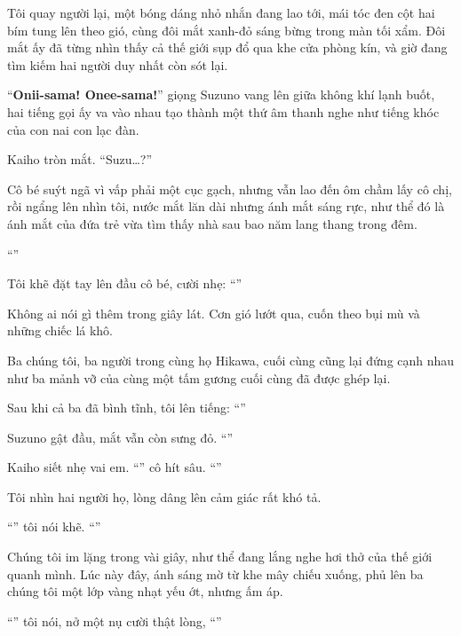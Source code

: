 \documentclass[../main.tex]{subfiles}
\begin{document}
Tôi quay người lại, một bóng dáng nhỏ nhắn đang lao tới, mái tóc đen cột hai bím tung lên theo gió, cùng đôi mắt xanh-đỏ sáng bừng trong màn tối xẩm. Đôi mắt ấy đã từng nhìn thấy cả thế giới sụp đổ qua khe cửa phòng kín, và giờ đang tìm kiếm hai người duy nhất còn sót lại.

``\textbf{Onii-sama! Onee-sama!}'' giọng Suzuno vang lên giữa không khí lạnh buốt, hai tiếng gọi ấy va vào nhau tạo thành một thứ âm thanh nghe như tiếng khóc của con nai con lạc đàn.

Kaiho tròn mắt. ``Suzu\dots?''

Cô bé suýt ngã vì vấp phải một cục gạch, nhưng vẫn lao đến ôm chầm lấy cô chị, rồi ngẩng lên nhìn tôi, nước mắt lăn dài nhưng ánh mắt sáng rực, như thể đó là ánh mắt của đứa trẻ vừa tìm thấy nhà sau bao năm lang thang trong đêm.

``''

Tôi khẽ đặt tay lên đầu cô bé, cười nhẹ: ``''

Không ai nói gì thêm trong giây lát. Cơn gió lướt qua, cuốn theo bụi mù và những chiếc lá khô.

Ba chúng tôi, ba người trong cùng họ Hikawa, cuối cùng cũng lại đứng cạnh nhau như ba mảnh vỡ của cùng một tấm gương cuối cùng đã được ghép lại.

Sau khi cả ba đã bình tĩnh, tôi lên tiếng:
``''

Suzuno gật đầu, mắt vẫn còn sưng đỏ. ``''

Kaiho siết nhẹ vai em. ``'' cô hít sâu. ``''

Tôi nhìn hai người họ, lòng dâng lên cảm giác rất khó tả.

``'' tôi nói khẽ. ``''

Chúng tôi im lặng trong vài giây, như thể đang lắng nghe hơi thở của thế giới quanh mình. Lúc này đây, ánh sáng mờ từ khe mây chiếu xuống, phủ lên ba chúng tôi một lớp vàng nhạt yếu ớt, nhưng ấm áp.

``'' tôi nói, nở một nụ cười thật lòng, ``''
\end{document}
